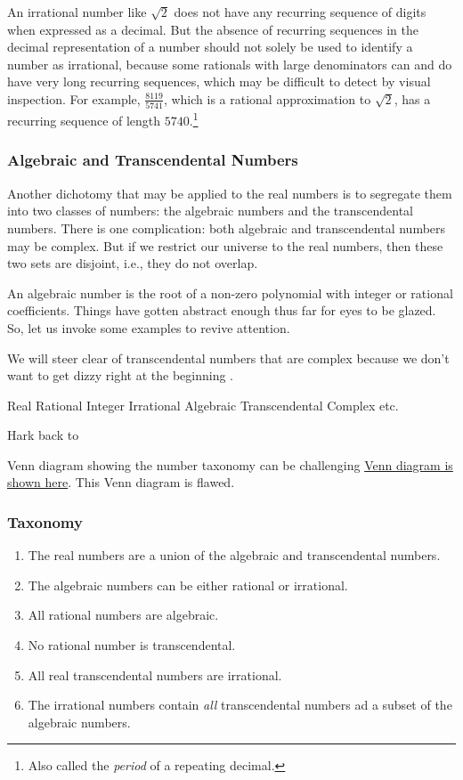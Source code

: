 \documentclass[
  a4paper,
]{article}
\begin{document}
An irrational number like \(\sqrt{2}\) does not have any recurring
sequence of digits when expressed as a decimal. But the absence of
recurring sequences in the decimal representation of a number should not
solely be used to identify a number as irrational, because some
rationals with large denominators can and do have very long recurring
sequences, which may be difficult to detect by visual inspection. For
example, \(\frac{8119}{5741}\), which is a rational approximation to
\(\sqrt{2}\), has a recurring sequence of length \(5740\).\footnote{Also
  called the \emph{period} of a repeating decimal.}

\subsubsection{Algebraic and Transcendental
Numbers}\label{algebraic-and-transcendental-numbers}

Another dichotomy that may be applied to the real numbers is to
segregate them into two classes of numbers: the algebraic numbers and
the transcendental numbers. There is one complication: both algebraic
and transcendental numbers may be complex. But if we restrict our
universe to the real numbers, then these two sets are disjoint, i.e.,
they do not overlap.

An algebraic number is the root of a non-zero polynomial with integer or
rational coefficients. Things have gotten abstract enough thus far for
eyes to be glazed. So, let us invoke some examples to revive attention.

We will steer clear of transcendental numbers that are complex because
we don't want to get dizzy right at the beginning 
\normalfont.

Real Rational Integer Irrational Algebraic Transcendental Complex etc.

Hark back to

Venn diagram showing the number taxonomy can be challenging
\href{https://mathmonks.com/transcendental-numbers}{Venn diagram is
shown here}. This Venn diagram is flawed.

\subsubsection{Taxonomy}\label{taxonomy}

\begin{enumerate}
\item
  The real numbers are a union of the algebraic and transcendental
  numbers.
\item
  The algebraic numbers can be either rational or irrational.
\item
  All rational numbers are algebraic.
\item
  No rational number is transcendental.
\item
  All real transcendental numbers are irrational.
\item
  The irrational numbers contain \emph{all} transcendental numbers ad a
  subset of the algebraic numbers.
\end{enumerate}
\end{document}
